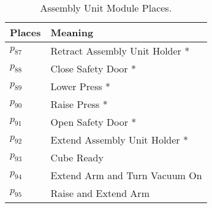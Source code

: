 \begin{table}[H]
\caption{Assembly Unit Module Places.}
\centering
\begin{tabular}{M{5cm}M{10cm}}
Places & Meaning\\
\hline
\hyperlink{partialNet:p87}{\hypertarget{partialTable:p87}{$p_{87}$}} & Retract Assembly Unit Holder *\\
\hyperlink{partialNet:p88}{\hypertarget{partialTable:p88}{$p_{88}$}} & Close Safety Door *\\
\hyperlink{partialNet:p89}{\hypertarget{partialTable:p89}{$p_{89}$}} & Lower Press *\\
\hyperlink{partialNet:p90}{\hypertarget{partialTable:p90}{$p_{90}$}} & Raise Press *\\
\hyperlink{partialNet:p91}{\hypertarget{partialTable:p91}{$p_{91}$}} & Open Safety Door *\\
\hyperlink{partialNet:p92}{\hypertarget{partialTable:p92}{$p_{92}$}} & Extend Assembly Unit Holder *\\
\hyperlink{partialNet:p93}{\hypertarget{partialTable:p93}{$p_{93}$}} & Cube Ready\\
\hyperlink{partialNet:p94}{\hypertarget{partialTable:p94}{$p_{94}$}} & Extend Arm and Turn Vacuum On\\
\hyperlink{partialNet:p95}{\hypertarget{partialTable:p95}{$p_{95}$}} & Raise and Extend Arm\\
\end{tabular}
\end{table}
